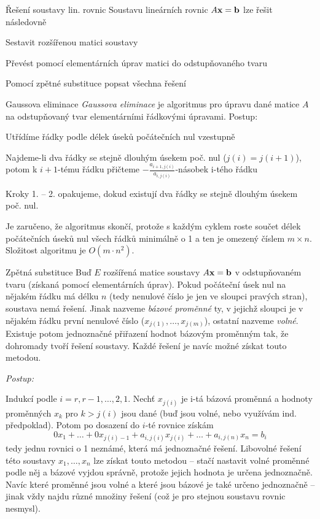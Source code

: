 \begin{algoritmusN}{Řešení soustavy lin. rovnic}
Soustavu lineárních rovnic $A\mathbf{x}=\mathbf{b}$ lze řešit následovně
\begin{penumerate}
    \item Sestavit rozšířenou matici soustavy
    \item Převést pomocí elementárních úprav matici do odstupňovaného tvaru
    \item Pomocí zpětné substituce popsat všechna řešení
\end{penumerate}
\end{algoritmusN}

\begin{algoritmusN}{Gaussova eliminace}
\emph{Gaussova eliminace} je algoritmus pro úpravu dané matice $A$ na odstupňovaný tvar elementárními řádkovými úpravami. Postup:
\begin{penumerate}
    \item Utřídíme řádky podle délek úseků počátečních nul vzestupně
    \item Najdeme-li dva řádky se stejně dlouhým úsekem poč. nul ($j(i)=j(i+1)$), potom k $i+1$-tému řádku přičteme $-\frac{a_{i+1,j(i)}}{a_{i,j(i)}}$-násobek i-tého řádku
    \item Kroky 1. -- 2. opakujeme, dokud existují dva řádky se stejně dlouhým úsekem poč. nul.
\end{penumerate}

\noindent
Je zaručeno, že algoritmus skončí, protože s každým cyklem roste součet délek počátečních úseků nul všech řádků minimálně o 1 a ten je omezený číslem $m\times n$. Složitost algoritmu je $O(m\cdot n^2)$.
\end{algoritmusN}

\begin{algoritmusN}{Zpětná substituce}
Buď $E$ rozšířená matice soustavy $A\mathbf{x}=\mathbf{b}$ v odstupňovaném tvaru (získaná pomocí elementárních úprav). Pokud počáteční úsek nul na nějakém řádku má délku $n$ (tedy nenulové číslo je jen ve sloupci pravých stran), soustava nemá řešení. Jinak nazveme \emph{bázové proměnné} ty, v jejichž sloupci je v nějakém řádku první nenulové číslo ($x_{j(1)},\dots,x_{j(m)}$), ostatní nazveme \emph{volné}. Existuje potom jednoznačné přiřazení hodnot bázovým proměnným tak, že dohromady tvoří řešení soustavy. Každé řešení je navíc možné získat touto metodou.

\medskip \noindent \emph{Postup:}

\noindent Indukcí podle $i=r,r-1,\dots,2,1$. Nechť $x_{j(i)}$ je i-tá bázová proměnná a hodnoty proměnných $x_k$ pro $k>j(i)$ jsou dané (buď jsou volné, nebo využívám ind. předpoklad). Potom po dosazení do $i$-té rovnice získám 
$$0x_1+\dots+0x_{j(i)-1}+a_{i,j(i)}x_{j(i)}+\dots+a_{i,j(n)}x_n=b_i$$
tedy jednu rovnici o 1 neznámé, která má jednoznačné řešení. Libovolné řešení této soustavy $x_1,\dots,x_n$ lze získat touto metodou -- stačí nastavit volné proměnné podle něj a bázové vyjdou správně, protože jejich hodnota je určena jednoznačně. Navíc které proměnné jsou volné a které jsou bázové je také určeno jednoznačně -- jinak vždy najdu různé množiny řešení (což je pro stejnou soustavu rovnic nesmysl).
\end{algoritmusN}

